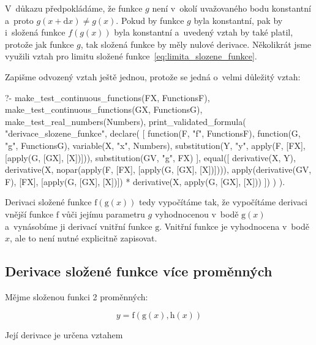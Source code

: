 V~důkazu předpokládáme, že funkce \(g\) není v~okolí uvažovaného bodu konstantní a~proto \(g(x + \mathrm{d}x) \neq g(x)\). Pokud by funkce  \(g\) byla konstantní, pak by i~složená funkce \(f(g(x))\) byla konstantní a~uvedený vztah by také platil, protože jak funkce \(g\), tak složená funkce by měly nulové derivace. Několikrát jsme využili vztah pro limitu složené funkce~\eqref{eq:limita_slozene_funkce}.

Zapišme odvozený vztah ještě jednou, protože se jedná o~velmi důležitý vztah:

\begin{fact}
\begin{prolog}
?-	make_test_continuous_functions(FX, FunctionsF),
	make_test_continuous_functions(GX, FunctionsG),
	make_test_real_numbers(Numbers),
	print_validated_formula(
		"derivace_slozene_funkce",
		declare(
			[
				function(F, "f", FunctionsF),
				function(G, "g", FunctionsG),
				variable(X, "x", Numbers),
				substitution(Y, "y", apply(F, [FX], [apply(G, [GX], [X])])),
				substitution(GV, "g", FX)   %
			],
			equal([
				derivative(X, Y),
				derivative(X, nopar(apply(F, [FX], [apply(G, [GX], [X])]))),
				apply(derivative(GV, F), [FX], [apply(G, [GX], [X])]) * derivative(X, apply(G, [GX], [X]))
			])
		)
	).
\end{prolog}
\end{fact}

Derivaci složené funkce \(\mathrm{f}(\mathrm{g}(x))\) tedy vypočítáme tak, že vypočítáme derivaci vnější funkce \(\mathrm{f}\) vůči jejímu parametru \(g\) vyhodnocenou v~bodě \(\mathrm{g}(x)\) a~vynásobíme ji derivací vnitřní funkce \(\mathrm{g}\). Vnitřní funkce je vyhodnocena v~bodě \(x\), ale to není nutné explicitně zapisovat.

\subsection{Derivace složené funkce více proměnných}

Mějme složenou funkci 2 proměnných:

\begin{equation}
y = \mathrm{f}(\mathrm{g}(x), \mathrm{h}(x))
\end{equation}

Její derivace je určena vztahem

